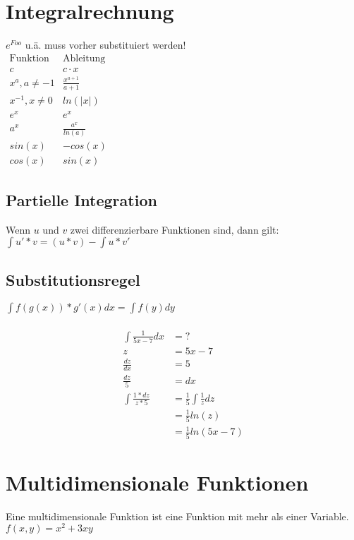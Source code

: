 \documentclass[a4paper,landscape, 11pt]{article}
\begin{document}
\begin{multicols}{4}
\begin{small}
    \section{Integralrechnung}
        $e^{Foo}$ u.ä. muss vorher substituiert werden!\\
        
        $
        \begin{matrix}
        \text{Funktion} & \text{Ableitung} \\
        c & c \cdot x \\
        x^a, a \neq -1 & \frac{x^{a+1}}{a+1}\\
        x^{-1}, x \neq 0 & ln(|x|)\\
        e^x & e^x \\
        a^x & \frac{a^x}{ln(a)} \\
        sin(x) & -cos(x)\\
        cos(x) & sin(x)
        \end{matrix}
        $
        
        
        \subsection{Partielle Integration}
        Wenn $u$ und $v$ zwei differenzierbare Funktionen sind, dann gilt: \\
        $\int u' * v = (u * v) - \int u * v'$
        \subsection{Substitutionsregel}
        $\int f(g(x)) * g'(x) dx = \int f(y) dy$
        \\ \\
        \begin{align}
            \int \frac{1}{5x - 7} dx &= ?\\
            z &= 5x - 7 \\
            \frac{dz}{dx} &= 5 \\   
            \frac{dz}{5} &= dx  \\
            \int \frac{1 * dz}{z * 5} &= \frac{1}{5} \int \frac{1}{z} dz \\
                                      &= \frac{1}{5} ln(z) \\
                                      &= \frac{1}{5} ln(5x-7)
        \end{align}
    \section{Multidimensionale Funktionen}
        Eine multidimensionale Funktion ist eine Funktion mit mehr als einer Variable.\\
       $f(x,y) = x^2 + 3xy$  
       

\end{small}
\end{multicols}
\end{document}
